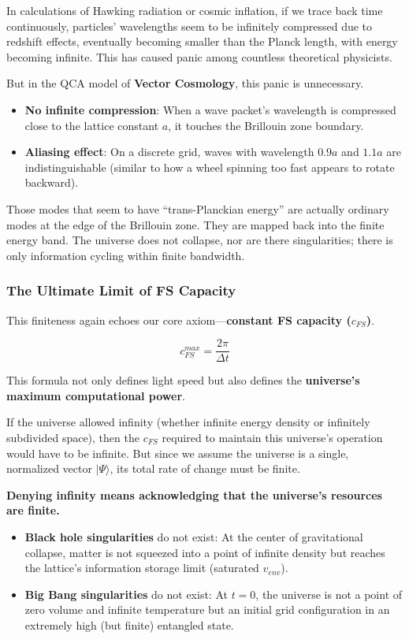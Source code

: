 In calculations of Hawking radiation or cosmic inflation, if we trace back time continuously, particles' wavelengths seem to be infinitely compressed due to redshift effects, eventually becoming smaller than the Planck length, with energy becoming infinite. This has caused panic among countless theoretical physicists.

But in the QCA model of \textbf{Vector Cosmology}, this panic is unnecessary.

\begin{itemize}
\item \textbf{No infinite compression}: When a wave packet's wavelength is compressed close to the lattice constant $a$, it touches the Brillouin zone boundary.

\item \textbf{Aliasing effect}: On a discrete grid, waves with wavelength $0.9a$ and $1.1a$ are indistinguishable (similar to how a wheel spinning too fast appears to rotate backward).
\end{itemize}

Those modes that seem to have ``trans-Planckian energy'' are actually ordinary modes at the edge of the Brillouin zone. They are mapped back into the finite energy band. The universe does not collapse, nor are there singularities; there is only information cycling within finite bandwidth.

\subsubsection{The Ultimate Limit of FS Capacity}

This finiteness again echoes our core axiom---\textbf{constant FS capacity ($c_{FS}$)}.

\[c_{FS}^{max} = \frac{2\pi}{\Delta t}\]

This formula not only defines light speed but also defines the \textbf{universe's maximum computational power}.

If the universe allowed infinity (whether infinite energy density or infinitely subdivided space), then the $c_{FS}$ required to maintain this universe's operation would have to be infinite. But since we assume the universe is a single, normalized vector $|\Psi\rangle$, its total rate of change must be finite.

\textbf{Denying infinity means acknowledging that the universe's resources are finite.}

\begin{itemize}
\item \textbf{Black hole singularities} do not exist: At the center of gravitational collapse, matter is not squeezed into a point of infinite density but reaches the lattice's information storage limit (saturated $v_{env}$).

\item \textbf{Big Bang singularities} do not exist: At $t=0$, the universe is not a point of zero volume and infinite temperature but an initial grid configuration in an extremely high (but finite) entangled state.
\end{itemize}

